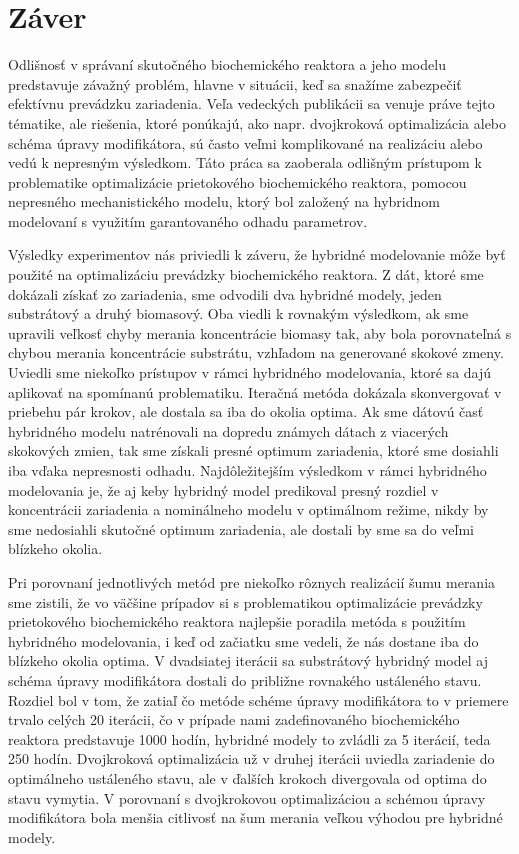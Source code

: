 \chapter{Záver}
Odlišnosť v správaní skutočného biochemického reaktora a jeho modelu predstavuje závažný problém, hlavne v situácii, keď sa snažíme zabezpečiť efektívnu prevádzku zariadenia. Veľa vedeckých publikácii sa venuje práve tejto tématike, ale riešenia, ktoré ponúkajú, ako napr. dvojkroková optimalizácia alebo schéma úpravy modifikátora, sú často veľmi komplikované na realizáciu alebo vedú k nepresným výsledkom. Táto práca sa zaoberala odlišným prístupom k problematike optimalizácie prietokového biochemického reaktora, pomocou nepresného mechanistického modelu, ktorý bol založený na hybridnom modelovaní s využitím garantovaného odhadu parametrov.

Výsledky experimentov nás priviedli k záveru, že hybridné modelovanie môže byť použité na optimalizáciu prevádzky biochemického reaktora. Z dát, ktoré sme dokázali získať zo zariadenia, sme odvodili dva hybridné modely, jeden substrátový a druhý biomasový. Oba viedli k rovnakým výsledkom, ak sme upravili veľkosť chyby merania koncentrácie biomasy tak, aby bola porovnateľná s chybou merania koncentrácie substrátu, vzhľadom na generované skokové zmeny. Uviedli sme niekoľko prístupov v rámci hybridného modelovania, ktoré sa dajú aplikovať na spomínanú problematiku. Iteračná metóda dokázala skonvergovať v priebehu pár krokov, ale dostala sa iba do okolia optima. Ak sme dátovú časť hybridného modelu natrénovali na dopredu známych dátach z viacerých skokových zmien, tak sme získali presné optimum zariadenia, ktoré sme dosiahli iba vďaka nepresnosti odhadu. Najdôležitejším výsledkom v rámci hybridného modelovania je, že aj keby hybridný model predikoval presný rozdiel v koncentrácii zariadenia a nominálneho modelu v optimálnom režime, nikdy by sme nedosiahli skutočné optimum zariadenia, ale dostali by sme sa do veľmi blízkeho okolia.

Pri porovnaní jednotlivých metód pre niekoľko rôznych realizácií šumu merania sme zistili, že vo väčšine prípadov si s problematikou optimalizácie prevádzky prietokového biochemického reaktora najlepšie poradila metóda s použitím hybridného modelovania, i keď od začiatku sme vedeli, že nás dostane iba do blízkeho okolia optima. V dvadsiatej iterácii sa substrátový hybridný model aj schéma úpravy modifikátora dostali do približne rovnakého ustáleného stavu. Rozdiel bol v tom, že zatiaľ čo metóde schéme úpravy modifikátora to v priemere trvalo celých 20 iterácii, čo v prípade nami zadefinovaného biochemického reaktora predstavuje 1000 hodín, hybridné modely to zvládli za 5 iterácií, teda 250 hodín. Dvojkroková optimalizácia už v druhej iterácii uviedla zariadenie do optimálneho ustáleného stavu, ale v ďalších krokoch divergovala od optima do stavu vymytia. V porovnaní s dvojkrokovou optimalizáciou a schémou úpravy modifikátora bola menšia citlivosť na šum merania veľkou výhodou pre hybridné modely.

